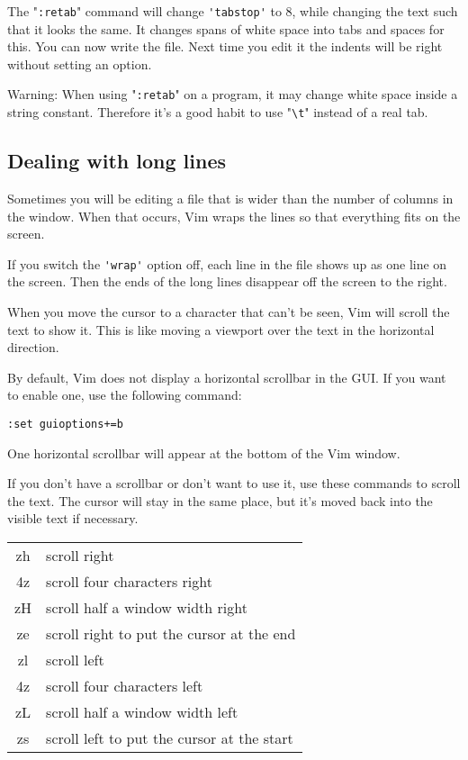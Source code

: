The "\verb!:retab!" command will change \verb!'tabstop'! to 8, while changing the text such that it looks the same.
It changes spans of white space into tabs and spaces for this.
You can now write the file.
Next time you edit it the indents will be right without setting an option.

Warning: When using "\verb!:retab!" on a program, it may change white space inside a string constant.
Therefore it's a good habit to use "\verb!\t!" instead of a real tab.
\subsection{Dealing with long lines}
Sometimes you will be editing a file that is wider than the number of columns in the window.
When that occurs, Vim wraps the lines so that everything fits on the screen.

If you switch the \verb!'wrap'! option off, each line in the file shows up as one line on the screen.
Then the ends of the long lines disappear off the screen to the right.

When you move the cursor to a character that can't be seen, Vim will scroll the text to show it.
This is like moving a viewport over the text in the horizontal direction.

By default, Vim does not display a horizontal scrollbar in the GUI.
If you want to enable one, use the following command:

\begin{Verbatim}[samepage=true]
 :set guioptions+=b
\end{Verbatim}

One horizontal scrollbar will appear at the bottom of the Vim window.

If you don't have a scrollbar or don't want to use it, use these commands to scroll the text.
The cursor will stay in the same place, but it's moved back into the visible text if necessary.

\begin{center} \begin{tabular}{c l}
				zh & scroll right \\
				4z & scroll four characters right \\
				zH & scroll half a window width right \\
				ze & scroll right to put the cursor at the end \\
				zl & scroll left \\
				4z & scroll four characters left \\
				zL & scroll half a window width left \\
				zs & scroll left to put the cursor at the start \\
\end{tabular} \end{center}

